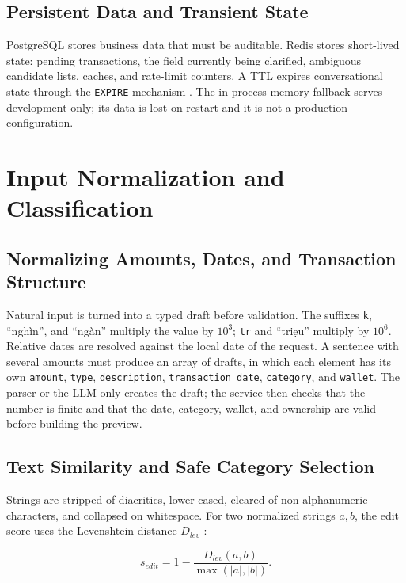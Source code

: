 \subsection{Persistent Data and Transient State}

PostgreSQL stores business data that must be auditable. Redis stores
short-lived state: pending transactions, the field currently being
clarified, ambiguous candidate lists, caches, and rate-limit counters.
A TTL expires conversational state through the \texttt{EXPIRE} mechanism
\cite{redisexpire}. The in-process memory fallback serves development
only; its data is lost on restart and it is not a production
configuration.

\section{Input Normalization and Classification}

\subsection{Normalizing Amounts, Dates, and Transaction Structure}

Natural input is turned into a typed draft before validation. The
suffixes \texttt{k}, ``ngh\`in'', and ``ng\`an'' multiply the value by
$10^3$; \texttt{tr} and ``tri\d{e}u'' multiply by $10^6$. Relative dates
are resolved against the local date of the request. A sentence with
several amounts must produce an array of drafts, in which each element
has its own \texttt{amount}, \texttt{type}, \texttt{description},
\texttt{transaction\_date}, \texttt{category}, and \texttt{wallet}. The
parser or the LLM only creates the draft; the service then checks that
the number is finite and that the date, category, wallet, and ownership
are valid before building the preview.

\subsection{Text Similarity and Safe Category Selection}

Strings are stripped of diacritics, lower-cased, cleared of
non-alphanumeric characters, and collapsed on whitespace. For two
normalized strings $a,b$, the edit score uses the Levenshtein distance
$D_{lev}$ \cite{levenshtein1966}:

\begin{equation}
  s_{edit}=1-\frac{D_{lev}(a,b)}{\max(|a|,|b|)}.
\end{equation}

